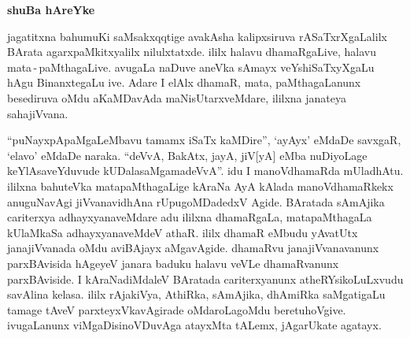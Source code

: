 





\begin{center}
{\Huge\bfseries shuBa hAreYke}
\end{center}

\thispagestyle{empty}

\bigskip

jagatitxna bahumuKi saMsakxqqtige avakAsha kalipxsiruva rASaTxrXgaLalilx BArata agarxpaMkitxyalilx nilulxtatxde. ililx halavu dhamaRgaLive, halavu mata\,-\,paMthagaLive. avugaLa naDuve aneVka sAmayx veYshiSaTxyXgaLu hAgu BinanxtegaLu ive. Adare I elAlx dhamaR, mata, paMthagaLanunx besediruva oMdu aKaMDavAda maNisUtarxveMdare, ililxna janateya sahajiVvana. 

\medskip

``puNayxpApaMgaLeMbavu tamamx iSaTx kaMDire'', `ayAyx' eMdaDe savxgaR, `elavo'  eMdaDe naraka. ``deVvA, BakAtx, jayA, jiV[yA] eMba nuDiyoLage keYlAsaveYduvude kUDalasaMgamadeVvA''. idu I manoV\-dhamaRda mUladhAtu. ililxna bahuteVka mata\-paMthagaLige kAraNa AyA kAlada manoVdhamaRkekx anuguNavAgi jiVvana\-vidhAna rUpugoMDadedxV Agide. BAratada sAmAjika cariterxya adhayxyanaveMdare adu ililxna dhamaRgaLa, matapaMthagaLa kUlaMkaSa \hbox{adhayxyanaveMdeV} athaR. ililx dhamaR eMbudu yAvatUtx janajiVvanada oMdu aviBAjayx aMgavAgide. dhamaRvu janajiVvanavanunx parxBAvisida hAgeyeV janara baduku halavu veVLe dhamaRvanunx parxBAviside. I kAraNadiMdaleV BAratada cariterxyanunx atheRYsikoLuLxvudu savAlina kelasa. ililx \hbox{rAjakiVya}, AthiRka, sAmAjika, dhAmiRka saMgatigaLu tamage tAveV parxteyxVkavAgirade oMdaroLagoMdu beretuhoVgive. ivu\-gaLanunx viMgaDisi\break noVDuvAga atayxMta tALemx, jAgarUkate agatayx.

\medskip

